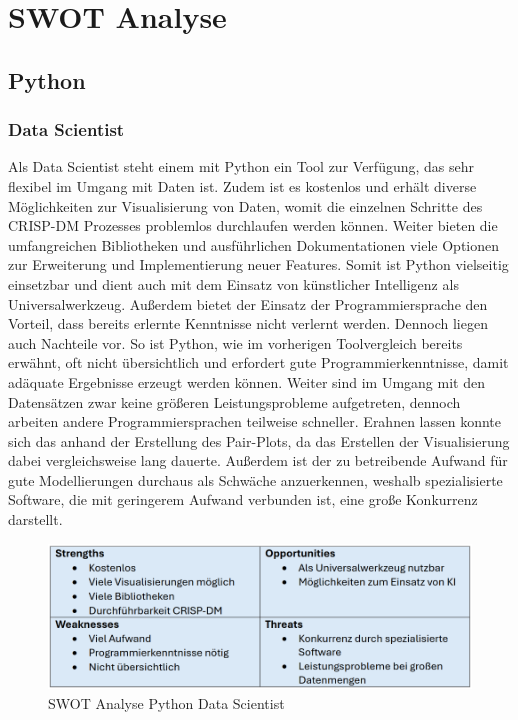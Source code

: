 \documentclass[12pt]{article}
\begin{document}
	\section{SWOT Analyse}
	
	\subsection{Python}
	
	\subsubsection{Data Scientist}
	
	Als Data Scientist steht einem mit Python ein Tool zur Verfügung, das sehr flexibel im Umgang mit Daten
	ist. Zudem ist es kostenlos und erhält diverse Möglichkeiten zur Visualisierung von
	Daten, womit die einzelnen Schritte des CRISP-DM Prozesses problemlos durchlaufen
	werden können.
	Weiter bieten die umfangreichen Bibliotheken und ausführlichen Dokumentationen
	viele Optionen zur Erweiterung und Implementierung neuer Features. Somit ist Python
	vielseitig einsetzbar und dient auch mit dem Einsatz von künstlicher Intelligenz als
	Universalwerkzeug.
	Außerdem bietet der Einsatz der Programmiersprache den Vorteil, dass bereits erlernte
	Kenntnisse nicht verlernt werden.
	Dennoch liegen auch Nachteile vor.
	So ist Python, wie im vorherigen Toolvergleich bereits erwähnt, oft nicht
	übersichtlich und erfordert gute Programmierkenntnisse, damit adäquate
	Ergebnisse erzeugt werden können. 
	Weiter sind im Umgang mit den Datensätzen zwar keine größeren Leistungsprobleme
	aufgetreten, dennoch arbeiten andere Programmiersprachen teilweise schneller. Erahnen lassen konnte sich das anhand der Erstellung des Pair-Plots, da das Erstellen der Visualisierung dabei vergleichsweise lang dauerte.
	Außerdem ist der zu betreibende Aufwand für gute Modellierungen durchaus als Schwäche
	anzuerkennen, weshalb spezialisierte Software, die mit geringerem Aufwand verbunden ist, eine große Konkurrenz darstellt.
	\begin{figure}[h]
		\centering
		\includegraphics[width=1.0\textwidth]{SWOT1}
		\caption{SWOT Analyse Python Data Scientist}
	\end{figure}
	
\end{document}
